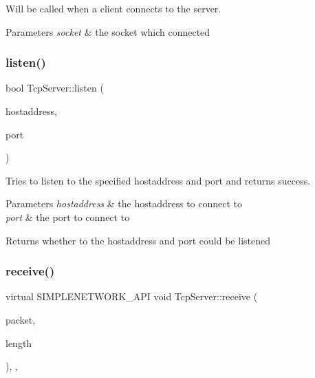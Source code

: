 Will be called when a client connects to the server. 


\begin{DoxyParams}{Parameters}
{\em socket} & the socket which connected \\
\hline
\end{DoxyParams}
\mbox{\label{class_tcp_server_a91c1c56fff64ace30c2622d0d939807e}} 
\subsubsection{\texorpdfstring{listen()}{listen()}}
{\footnotesize\ttfamily bool Tcp\+Server\+::listen (\begin{DoxyParamCaption}\item[{const A\+String \&}]{hostaddress,  }\item[{ushort}]{port }\end{DoxyParamCaption})\hspace{0.3cm}{\ttfamily [virtual]}}



Tries to listen to the specified hostaddress and port and returns success. 


\begin{DoxyParams}{Parameters}
{\em hostaddress} & the hostaddress to connect to \\
\hline
{\em port} & the port to connect to \\
\hline
\end{DoxyParams}
\begin{DoxyReturn}{Returns}
whether to the hostaddress and port could be listened 
\end{DoxyReturn}
\mbox{\label{class_tcp_server_afb492b671a8960d2969f22a3c9408ba7}} 
\subsubsection{\texorpdfstring{receive()}{receive()}}
{\footnotesize\ttfamily virtual S\+I\+M\+P\+L\+E\+N\+E\+T\+W\+O\+R\+K\+\_\+\+A\+PI void Tcp\+Server\+::receive (\begin{DoxyParamCaption}\item[{const char $\ast$}]{packet,  }\item[{uint}]{length }\end{DoxyParamCaption})\hspace{0.3cm}{\ttfamily [override]}, {\ttfamily [protected]}, {}}



